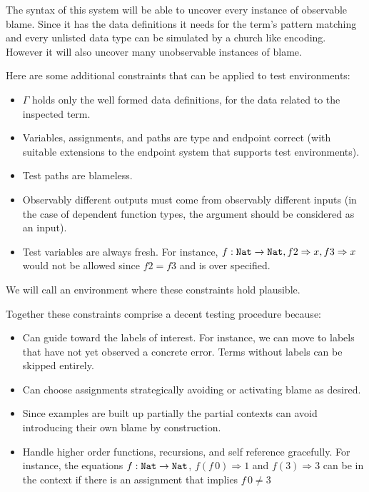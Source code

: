 The syntax of this system will be able to uncover every instance of observable blame.
Since it has the data definitions it needs for the term's pattern matching and every unlisted data type can be simulated by a church like encoding.
However it will also uncover many unobservable instances of blame.

Here are some additional constraints that can be applied to test environments:

\begin{itemize}
  \item $\Gamma$ holds only the well formed data definitions, for the data related to the inspected term.
  \item Variables, assignments, and paths are type and endpoint correct (with suitable extensions to the endpoint system that supports test environments).
  \item Test paths are blameless.
  \item Observably different outputs must come from observably different inputs (in the case of dependent function types, the argument should be considered as an input).
  \item Test variables are always fresh.
  For instance, $f:\mathtt{Nat}{}\rightarrow\mathtt{Nat}{},f2\Rightarrow x,f3\Rightarrow x$ would not be allowed since $f2=f3$ and is over specified.
\end{itemize}
We will call an environment where these constraints hold plausible.

Together these constraints comprise a decent testing procedure because:
\begin{itemize}
\item Can guide toward the labels of interest.
For instance, we can move to labels that have not yet observed a concrete error.
Terms without labels can be skipped entirely.
\item Can choose assignments strategically avoiding or activating blame as desired.
\item Since examples are built up partially the partial contexts can avoid introducing their own blame by construction.
\item Handle higher order functions, recursions, and self reference gracefully.
For instance, the equations $f: \mathtt{Nat}{} \rightarrow \mathtt{Nat}{}$, $f\left(f\,0\right)\Rightarrow 1$ and $f\left(3\right)\Rightarrow 3$ can be in the context if there is an assignment that implies $f\,0\neq3$
\end{itemize}
  
  
  
